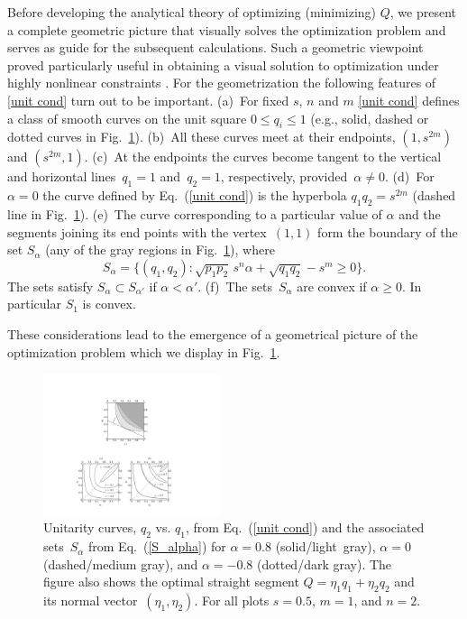 \documentclass[aps,prl,twocolumn,showpacs]{revtex4}
\begin{document}
Before developing the analytical theory of optimizing (minimizing) $Q$, we present a complete geometric picture that visually solves the optimization problem and serves as guide for the subsequent calculations. Such a geometric viewpoint proved particularly useful in obtaining a visual solution to optimization under highly nonlinear constraints \cite{Bergou1}. For the geometrization the following features of \eqref{unit cond} turn out to be important. (a)~For fixed $s$, $n$ and $m$ \eqref{unit cond} defines a class of smooth curves on the unit square $0\le q_i\le 1$ (e.g., solid, dashed or dotted curves in Fig.~\ref{fig:1}). (b)~All these curves meet at their endpoints, $(1,s^{2m})$ and $(s^{2m},1)$. (c)~At the endpoints  the curves become tangent to the vertical and horizontal lines~$q_1=1$ and~$q_2=1$, respectively, provided~$\alpha\not=0$. %
(d)~For~$\alpha=0$ the curve defined by Eq.~(\ref{unit cond}) is the hyperbola $q_1 q_2=s^{2m}$ (dashed line in Fig.~\ref{fig:1}). (e)~The curve corresponding to a particular value of $\alpha$ and the segments joining its end points with the vertex~$(1,1)$ form the boundary of the set $S_{\alpha}$ (any of the gray regions in Fig.~\ref{fig:1}), where
%
\begin{equation}
S_\alpha=\{ (q_1,q_2): \sqrt{p_1 p_2}\,s^n\alpha+\sqrt{q_1 q_2}-s^m\ge 0\}.
\label{S_alpha}
\end{equation}
%
The sets satisfy $S_{\alpha} \subset S_{\alpha'}$ if $\alpha<\alpha'$.
(f)~The sets~$S_\alpha$ are convex if $\alpha \ge 0$. In particular $S_1$ is convex.

These considerations lead to the emergence of a geometrical picture of the optimization problem which we display in Fig.~\ref{fig:1}.

\begin{figure}[h,t]
\centering
\includegraphics[width=14em]{Fig_1NC.pdf}
%
\caption{Unitarity curves, $q_{2}$ vs. $q_{1}$, from Eq.~(\ref{unit cond}) and the associated sets~$S_\alpha$ from Eq.~(\ref{S_alpha}) for $\alpha=0.8$ (solid/light~gray), $\alpha=0$ (dashed/medium gray), and $\alpha=-0.8$ (dotted/dark gray). The figure also shows the optimal straight segment \mbox{$Q=\eta_1 q_1+\eta_2 q_2$} and its normal vector~$(\eta_1,\eta_2)$. For all plots  $s = 0.5$, $m = 1$, and $n =2$.}
\label{fig:1}
\end{figure}
\end{document}
